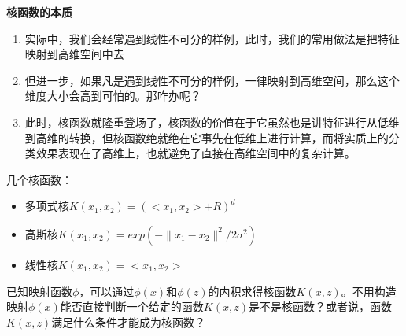 \textbf{核函数的本质}
\begin{enumerate}
	\item 实际中，我们会经常遇到线性不可分的样例，此时，我们的常用做法是把特征映射到高维空间中去
	\item 但进一步，如果凡是遇到线性不可分的样例，一律映射到高维空间，那么这个维度大小会高到可怕的。那咋办呢？
	\item 此时，核函数就隆重登场了，核函数的价值在于它虽然也是讲特征进行从低维到高维的转换，但核函数绝就绝在它事先在低维上进行计算，而将实质上的分类效果表现在了高维上，也就避免了直接在高维空间中的复杂计算。
\end{enumerate}

几个核函数：
\begin{itemize}
	\item 多项式核$K(x_1,x_2) = (<x_1, x_2> + R)^d $
	\item 高斯核$K(x_1,x_2) = exp(-\lVert x_1 - x_2 \rVert ^2 / 2\sigma ^2)$
	\item 线性核$K(x_1,x_2) = <x_1, x_2> $
\end{itemize}

已知映射函数$\phi$，可以通过$\phi(x)$和$\phi(z)$的内积求得核函数$K(x,z)$。不用构造映射$\phi(x)$能否直接判断一个给定的函数$K(x,z)$是不是核函数？或者说，函数$K(x,z)$满足什么条件才能成为核函数？

